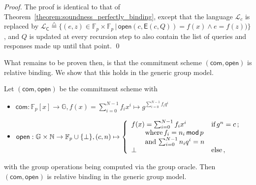 \documentclass[10pt]{llncs}
\begin{document}
\begin{proof}
The proof is identical to that of Theorem~\ref{theorem:soundness_perfectly_binding}, except that the language $\mathcal{L}_c$ is replaced by $\mathcal{L}_{\mathsf{C}} \stackrel{\triangle}{=} \{(e,z) \in \mathbb{F}_p \times \mathbb{F}_p \, | \, \mathsf{open}(c, \mathsf{E}(c, Q)) = f(x) \wedge e = f(z))\}$, and $Q$ is updated at every recursion step to also contain the list of queries and responses made up until that point. \qed
\end{proof}

What remains to be proven then, is that the commitment scheme $(\mathsf{com}, \mathsf{open})$ is relative binding. We show that this holds in the generic group model.

\begin{theorem} \label{theorem:relative_binding}
Let $(\mathsf{com}, \mathsf{open})$ be the commitment scheme with
\begin{itemize}
\item $\mathsf{com} : \mathbb{F}_p[x] \rightarrow \mathbb{G}, f(x) = \sum_{i=0}^{N-1} f_i x^i \mapsto g^{\sum_{i=0}^{N-1} f_iq^i}$
\item $\mathsf{open} : \mathbb{G} \times \mathbb{N} \rightarrow \mathbb{F}_p \cup \{\bot\} , (c, n) \mapsto \left\lbrace \begin{array}{ll}
f(x) = \sum_{i=0}^{N-1} f_i x^i \quad & \textnormal{if} \, g^n = c \, ; \\
\quad \quad \textnormal{where} \, f_i = n_i \, \mathsf{mod} \, p & \\
\quad \quad \textnormal{and} \, \sum_{i=0}^{N-1} n_iq^i = n & \\
\bot & \textnormal{else} \, ,
\end{array} \right.$
\end{itemize}
with the group operations being computed via the group oracle. Then $(\mathsf{com}, \mathsf{open})$ is relative binding in the generic group model.
\end{theorem}
\end{document}
